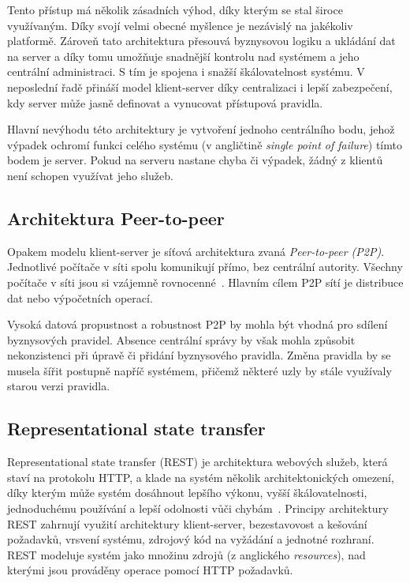 Tento přístup má několik zásadních výhod, díky kterým se stal
široce využívaným. Díky svojí velmi obecné myšlence je nezávislý
na jakékoliv platformě.
Zároveň tato architektura přesouvá byznysovou logiku a
ukládání dat na server a díky tomu umožňuje
snadnější kontrolu nad systémem a jeho centrální administraci. S tím
je spojena i snažší škálovatelnost systému. V neposlední řadě
přináší model klient-server díky centralizaci i lepší zabezpečení,
kdy server může jasně definovat a vynucovat přístupová pravidla.

Hlavní nevýhodu této architektury je vytvoření jednoho centrálního bodu,
jehož výpadek ochromí funkci celého systému (v angličtině
\textit{single point of failure}) \textendash\xspace tímto bodem je server.
Pokud na serveru nastane chyba či výpadek, žádný z klientů není schopen využívat
jeho služeb.

\subsection{Architektura Peer-to-peer}\label{sec:p2p}

Opakem modelu klient-server je síťová architektura zvaná \textit{Peer-to-peer (\gls{P2P})}.
Jednotlivé počítače v síti spolu komunikují přímo, bez centrální autority.
Všechny počítače v síti jsou si vzájemně rovnocenné~\cite{fox2001peer}.
Hlavním cílem \gls{P2P} sítí je distribuce dat nebo výpočetních operací.


Vysoká datová propustnost a robustnost \gls{P2P} by mohla být vhodná pro
sdílení byznysových pravidel. Absence centrální správy by však mohla způsobit
nekonzistenci při úpravě či přidání byznysového pravidla. Změna pravidla by se
musela šířit postupně napříč systémem, přičemž některé uzly by stále využívaly starou
verzi pravidla.

\subsection{Representational state transfer}\label{sec:rest}

Representational state transfer (\gls{REST}) je architektura
webových služeb, která staví na protokolu \gls{HTTP}, a klade na systém
několik architektonických omezení, díky kterým může systém dosáhnout
lepšího výkonu, vyšší škálovatelnosti, jednoduchému používání
a lepší odolnosti vůči chybám~\cite{fielding2000rest}. Principy architektury
\gls{REST} zahrnují využití architektury klient-server, bezestavovost a kešování požadavků,
vrsvení systému, zdrojový kód na vyžádání a jednotné rozhraní.
\gls{REST} modeluje systém jako množinu zdrojů (z anglického \textit{resources}),
nad kterými jsou prováděny operace pomocí \gls{HTTP} požadavků.

